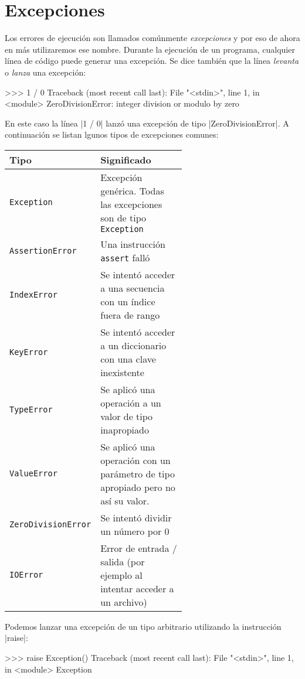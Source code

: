 \section{Excepciones}

Los errores de ejecución son llamados comúnmente {\it excepciones} y por eso
de ahora en más utilizaremos ese nombre. Durante la ejecución de un programa,
cualquier línea de código puede generar una excepción. Se dice también que la
línea {\it levanta} o {\it lanza} una excepción:

\begin{codigo-python-sn}
>>> 1 / 0
Traceback (most recent call last):
  File "<stdin>", line 1, in <module>
ZeroDivisionError: integer division or modulo by zero
\end{codigo-python-sn}

En este caso la línea |1 / 0| lanzó una excepción de tipo |ZeroDivisionError|.
A continuación se listan lgunos tipos de excepciones comunes:

\begin{center}
\begin{tabular}{l p{0.6\linewidth}}
{\bf Tipo} & {\bf Significado} \\
\hline
\lstinline!Exception! & Excepción genérica. Todas las excepciones son de tipo \lstinline!Exception! \\
\lstinline!AssertionError! & Una instrucción \lstinline!assert!  falló \\
\lstinline!IndexError! & Se intentó acceder a una secuencia con un índice fuera de rango \\
\lstinline!KeyError! & Se intentó acceder a un diccionario con una clave inexistente \\
\lstinline!TypeError! & Se aplicó una operación a un valor de tipo inapropiado \\
\lstinline!ValueError! & Se aplicó una operación con un parámetro de
    tipo apropiado pero no así su valor. \\
\lstinline!ZeroDivisionError! & Se intentó dividir un número por 0 \\
\lstinline!IOError! & Error de entrada / salida (por ejemplo al intentar
    acceder a un archivo) \\
\end{tabular}
\end{center}

Podemos lanzar una excepción de un tipo arbitrario utilizando la instrucción
|raise|:

\begin{codigo-python-sn}
>>> raise Exception()
Traceback (most recent call last):
  File "<stdin>", line 1, in <module>
Exception
\end{codigo-python-sn}

